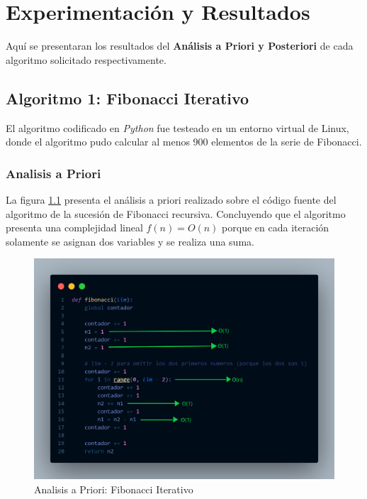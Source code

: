 \chapter{Experimentación y Resultados}
    Aquí se presentaran los resultados del \textbf{Análisis a Priori y Posteriori} de cada algoritmo solicitado respectivamente.
    
\section{Algoritmo 1: Fibonacci Iterativo}
    El algoritmo codificado en \textit{Python} fue testeado en un entorno virtual de Linux, donde el algoritmo pudo calcular al menos 900 elementos de la serie de Fibonacci.
    \subsection{Analisis a Priori }
        La figura \ref{fig:iterativo_f} presenta el análisis a priori realizado sobre el código fuente del algoritmo de la sucesión de Fibonacci recursiva. Concluyendo que el algoritmo presenta una complejidad lineal \(f(n) = O(n)\) porque en cada iteración solamente se asignan dos variables y se realiza una suma.
        
        \begin{figure}[htp!]
            \centering
            \includegraphics[width=0.7 \textwidth]{Images/priori_iterativo.png}
            \caption{Analisis a Priori: Fibonacci Iterativo}
            \label{fig:iterativo_f}
        \end{figure}
    
    \newpage    
